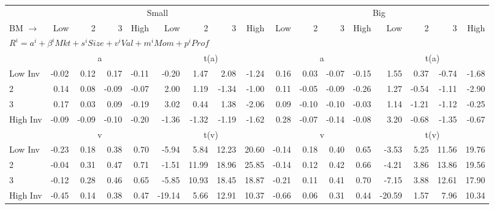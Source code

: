 

\begin{tabular}{lrrrrrrrrrrrrrrrr}
  \toprule
     & \multicolumn{8}{c}{Small} & \multicolumn{8}{c}{Big}  \\
     \cmidrule(r){2-9} \cmidrule(r){10-17}
    BM $\rightarrow$ & Low & 2 & 3 & High & Low & 2 & 3 & High & Low & 2 & 3 & High & Low & 2 & 3 & High  \\ 
  \midrule
  \multicolumn{17}{l}{$R^i=a^i+\beta^iMkt+s^iSize+v^iVal+m^iMom+p^iProf$}  \\
  
     & \multicolumn{4}{c}{a} & \multicolumn{4}{c}{t(a)}  & \multicolumn{4}{c}{a} & \multicolumn{4}{c}{t(a)}   \\
     \cmidrule(r){2-5} \cmidrule(r){6-9}  \cmidrule(r){10-13} \cmidrule(r){14-17} 
    Low Inv  & -0.02  & 0.12  & 0.17  & -0.11  & -0.20  & 1.47  & 2.08  & -1.24  & 0.16  & 0.03  & -0.07  & -0.15  & 1.55  & 0.37  & -0.74  & -1.68   \\
    2  & 0.14  & 0.08  & -0.09  & -0.07  & 2.00  & 1.19  & -1.34  & -1.00  & 0.11  & -0.05  & -0.09  & -0.26  & 1.27  & -0.54  & -1.11  & -2.90   \\
    3  & 0.17  & 0.03  & 0.09  & -0.19  & 3.02  & 0.44  & 1.38  & -2.06  & 0.09  & -0.10  & -0.10  & -0.03  & 1.14  & -1.21  & -1.12  & -0.25   \\
    High Inv  & -0.09  & -0.09  & -0.10  & -0.20  & -1.36  & -1.32  & -1.19  & -1.62  & 0.28  & -0.07  & -0.14  & -0.08  & 3.20  & -0.68  & -1.35  & -0.67   \\
   
  
     & \multicolumn{4}{c}{v} & \multicolumn{4}{c}{t(v)}  & \multicolumn{4}{c}{v} & \multicolumn{4}{c}{t(v)}   \\
     \cmidrule(r){2-5} \cmidrule(r){6-9}  \cmidrule(r){10-13} \cmidrule(r){14-17} 
    Low Inv  & -0.23  & 0.18  & 0.38  & 0.70  & -5.94  & 5.84  & 12.23  & 20.60  & -0.14  & 0.18  & 0.40  & 0.65  & -3.53  & 5.25  & 11.56  & 19.76   \\
    2  & -0.04  & 0.31  & 0.47  & 0.71  & -1.51  & 11.99  & 18.96  & 25.85  & -0.14  & 0.12  & 0.42  & 0.66  & -4.21  & 3.86  & 13.86  & 19.56   \\
    3  & -0.12  & 0.28  & 0.46  & 0.65  & -5.85  & 10.93  & 18.45  & 18.87  & -0.21  & 0.11  & 0.41  & 0.70  & -7.15  & 3.88  & 12.61  & 17.90   \\
    High Inv  & -0.45  & 0.14  & 0.38  & 0.47  & -19.14  & 5.66  & 12.91  & 10.37  & -0.66  & 0.06  & 0.31  & 0.44  & -20.59  & 1.57  & 7.96  & 10.34   \\
    

\end{tabular}
